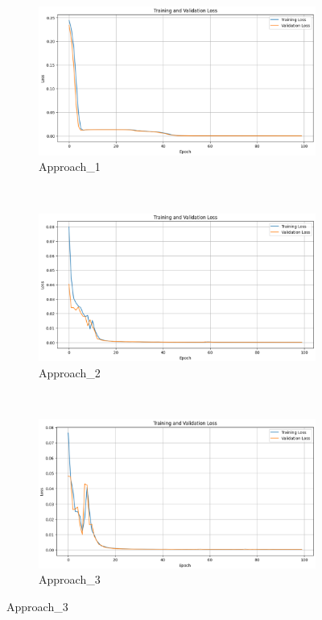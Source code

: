 \documentclass[12pt,DIV14,BCOR12mm,a4paper,footinclude=false,headinclude,parskip=half-,twoside,openright,cleardoublepage=empty,toc=index,bibliography=totoc,listof=totoc]{scrreprt}
\numberwithin{equation}{chapter}
\begin{document}
\begin{figure}
    \centering
    \begin{subfigure}[b]{0.7\textwidth} %
        \centering
        \includegraphics[width=\textwidth]{../media/approach1_lossplot.PNG}
        \caption{Approach\_1}
        \label{fig:approach1}
    \end{subfigure}
    \\ %
    \begin{subfigure}[b]{0.7\textwidth} %
        \centering
        \includegraphics[width=\textwidth]{../media/approach2_lossplot.PNG}
        \caption{Approach\_2}
        \label{fig:approach2}
    \end{subfigure}
    \\ %
    \begin{subfigure}[b]{0.7\textwidth} %
        \centering
        \includegraphics[width=\textwidth]{../media/approach3_lossplot.PNG}
        \caption{Approach\_3}
        \label{fig:approach3}
    \end{subfigure}
    

\end{figure}
\end{document}

